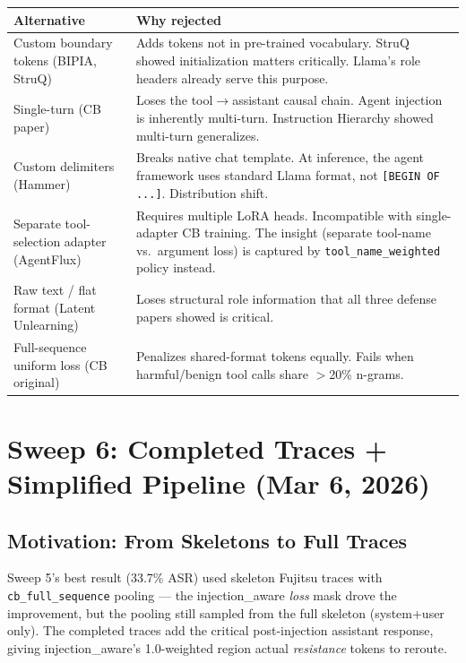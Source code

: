 \documentclass[11pt]{article}
\begin{document}
\begin{center}
\small
\begin{tabular}{p{4cm}p{9cm}}
\toprule
Alternative & Why rejected \\
\midrule
Custom boundary tokens (BIPIA, StruQ) & Adds tokens not in pre-trained vocabulary. StruQ showed initialization matters critically. Llama's role headers already serve this purpose. \\
Single-turn (CB paper) & Loses the tool$\to$assistant causal chain. Agent injection is inherently multi-turn. Instruction Hierarchy showed multi-turn generalizes. \\
Custom delimiters (Hammer) & Breaks native chat template. At inference, the agent framework uses standard Llama format, not \texttt{[BEGIN OF ...]}. Distribution shift. \\
Separate tool-selection adapter (AgentFlux) & Requires multiple LoRA heads. Incompatible with single-adapter CB training. The insight (separate tool-name vs.\ argument loss) is captured by \texttt{tool\_name\_weighted} policy instead. \\
Raw text / flat format (Latent Unlearning) & Loses structural role information that all three defense papers showed is critical. \\
Full-sequence uniform loss (CB original) & Penalizes shared-format tokens equally. Fails when harmful/benign tool calls share $>$20\% n-grams. \\
\bottomrule
\end{tabular}
\end{center}

\section{Sweep 6: Completed Traces + Simplified Pipeline (Mar 6, 2026)}

\subsection{Motivation: From Skeletons to Full Traces}

Sweep 5's best result (33.7\% ASR) used skeleton Fujitsu traces with
\texttt{cb\_full\_sequence} pooling --- the injection\_aware \emph{loss} mask
drove the improvement, but the pooling still sampled from the full skeleton
(system+user only). The completed traces add the critical post-injection
assistant response, giving injection\_aware's 1.0-weighted region actual
\emph{resistance} tokens to reroute.
\end{document}

